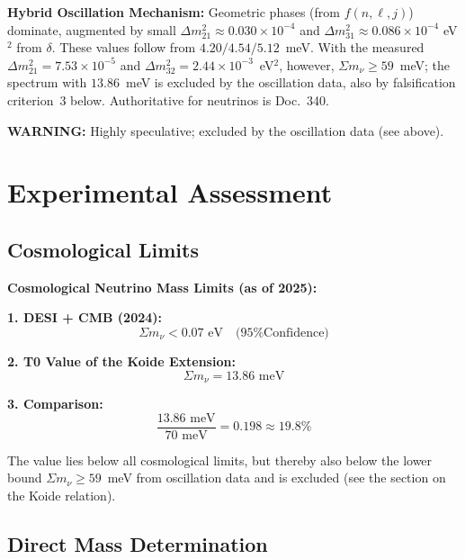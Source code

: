 \begin{koidebox}
		\textbf{Hybrid Oscillation Mechanism:}
		Geometric phases (from $f(n,\ell,j)$) dominate, augmented by small $\Delta m^2_{21} \approx 0.030 \times 10^{-4}$ and $\Delta m^2_{31} \approx 0.086 \times 10^{-4}$ eV$^2$ from $\delta$.
				These values follow from $4.20/4.54/5.12$~meV. With the measured $\Delta m^2_{21} = 7.53 \times 10^{-5}$ and $\Delta m^2_{32} = 2.44 \times 10^{-3}$~eV$^2$, however, $\Sigma m_\nu \geq 59$~meV; the spectrum with $13.86$~meV is excluded by the oscillation data, also by falsification criterion~3 below. Authoritative for neutrinos is Doc.~340.

		\textbf{WARNING:} Highly speculative; excluded by the oscillation data (see above).
	\end{koidebox}
	
	\section{Experimental Assessment}
	
	\subsection{Cosmological Limits}
	
	\begin{experimental}
		\textbf{Cosmological Neutrino Mass Limits (as of 2025):}
		
		\textbf{1. DESI + CMB (2024):}
		\begin{equation}
			\Sigma m_\nu < 0.07 \text{ eV} \quad \text{(95\% Confidence)}
		\end{equation}
		
		\textbf{2. T0 Value of the Koide Extension:}
		\begin{equation}
			\Sigma m_\nu = 13.86 \text{ meV}
		\end{equation}
		
		\textbf{3. Comparison:}
		\begin{equation}
			\frac{13.86 \text{ meV}}{70 \text{ meV}} = 0.198 \approx 19.8\%
		\end{equation}
		
		The value lies below all cosmological limits, but thereby also below the lower bound $\Sigma m_\nu \geq 59$~meV from oscillation data and is excluded (see the section on the Koide relation).
	\end{experimental}
	
	\subsection{Direct Mass Determination}
	
